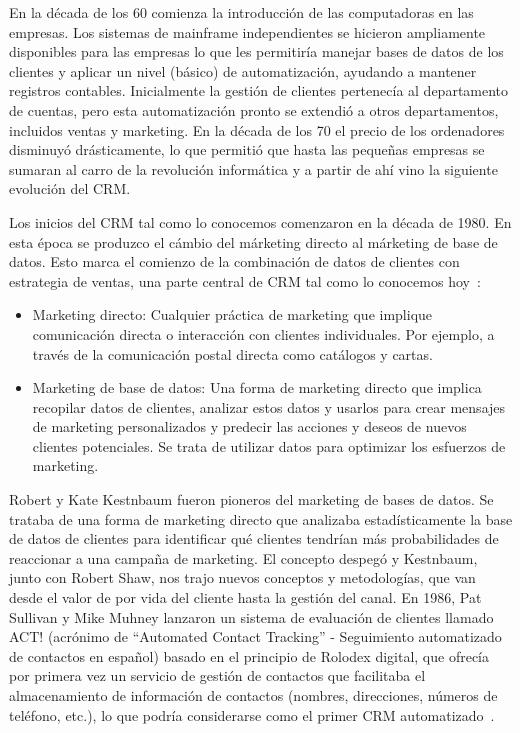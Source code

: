 En la década de los 60 comienza la introducción de las computadoras en las empresas. Los sistemas de mainframe independientes se hicieron ampliamente disponibles para las empresas lo que les permitiría manejar bases de datos de los clientes y aplicar un nivel (básico) de automatización, ayudando a mantener registros contables. Inicialmente la gestión de clientes pertenecía al departamento de cuentas, pero esta automatización pronto se extendió a otros departamentos, incluidos ventas y marketing. En la década de los 70 el precio de los ordenadores disminuyó drásticamente, lo que permitió que hasta las pequeñas empresas se sumaran al carro de la revolución informática y a partir de ahí vino la siguiente evolución del CRM.


Los inicios del CRM tal como lo conocemos comenzaron en la década de 1980. En esta época se produzco el cámbio del márketing directo al márketing de base de datos. Esto marca el comienzo de la combinación de datos de clientes con estrategia de ventas, una parte central de CRM tal como lo conocemos hoy~\citep{ThinkautomationCRM}:
\begin{itemize}
\item Marketing directo: Cualquier práctica de marketing que implique comunicación directa o interacción con clientes individuales. Por ejemplo, a través de la comunicación postal directa como catálogos y cartas.
\item Marketing de base de datos: Una forma de marketing directo que implica recopilar datos de clientes, analizar estos datos y usarlos para crear mensajes de marketing personalizados y predecir las acciones y deseos de nuevos clientes potenciales. Se trata de utilizar datos para optimizar los esfuerzos de marketing.
\end{itemize}


Robert y Kate Kestnbaum fueron pioneros del marketing de bases de datos. Se trataba de una forma de marketing directo que analizaba estadísticamente la base de datos de clientes para identificar qué clientes tendrían más probabilidades de reaccionar a una campaña de marketing. El concepto despegó y Kestnbaum, junto con Robert Shaw, nos trajo nuevos conceptos y metodologías, que van desde el valor de por vida del cliente hasta la gestión del canal. En 1986, Pat Sullivan y Mike Muhney lanzaron un sistema de evaluación de clientes llamado ACT! (acrónimo de ``Automated Contact Tracking'' - Seguimiento automatizado de contactos en español) basado en el principio de Rolodex digital, que ofrecía por primera vez un servicio de gestión de contactos que facilitaba el almacenamiento de información de contactos (nombres, direcciones, números de teléfono, etc.), lo que podría considerarse como el primer CRM automatizado~\cite{SalesforceCRM}. 


